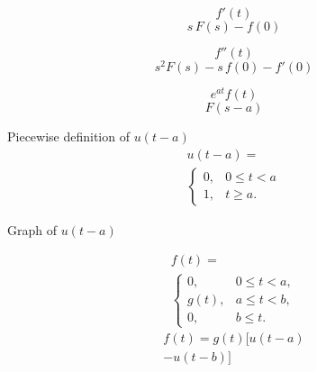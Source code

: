 \documentclass[grid, poker_portrait]{flashcards}
\begin{document}

  \begin{flashcard}{ \[ f'(t) \] }
    \[
      s \, F(s)-f(0)
    \]
  \end{flashcard}

  \begin{flashcard}{ \[ f''(t) \] }
    \[
      s^{2} F(s) -s\,f(0) - f'(0)
    \]
  \end{flashcard}



  \begin{flashcard}{ \[ e^{at} f(t) \] }
    \[
      F(s-a)
    \]
  \end{flashcard}

  \begin{flashcard}{Piecewise definition of $ u(t - a) $}
    \[
        \begin{multlined}
            u(t - a) = \\
            \begin{cases}
                0, & 0 \leq t < a \\
                1, & t \geq a.
            \end{cases}
        \end{multlined}
    \]
  \end{flashcard}

  \begin{flashcard}{Graph of $ u(t - a) $}
  \end{flashcard}

  \begin{flashcard}{
    \[
        \begin{multlined} 
            f(t) = \\
            \begin{cases}
                  0,    & 0 \leq t < a, \\
                  g(t), & a \leq t < b, \\
                  0,    & b \leq t.
            \end{cases}
        \end{multlined}
    \]
    }
    \[
        \begin{multlined}
            f(t) = g(t) \Big [ u(t-a) \\
              - u(t-b) \Big ]
        \end{multlined}
    \]
  \end{flashcard}
\end{document}
